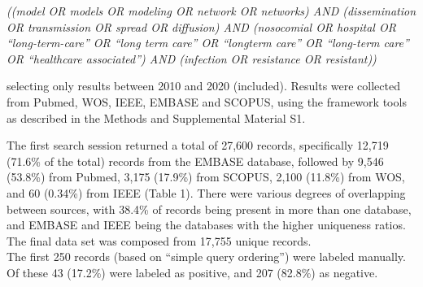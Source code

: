 \documentclass{article}
\begin{document}
\emph{((model OR models OR modeling OR network OR networks) AND
(dissemination OR transmission OR spread OR diffusion) AND (nosocomial
OR hospital OR ``long-term-care'' OR ``long term care'' OR ``longterm
care'' OR ``long-term care'' OR ``healthcare associated'') AND
(infection OR resistance OR resistant))}

selecting only results between 2010 and 2020 (included). Results were
collected from Pubmed, WOS, IEEE, EMBASE and SCOPUS, using the framework
tools as described in the Methods and Supplemental Material S1.

The first search session returned a total of 27,600 records,
specifically 12,719 (71.6\% of the total) records from the EMBASE
database, followed by 9,546 (53.8\%) from Pubmed, 3,175 (17.9\%) from
SCOPUS, 2,100 (11.8\%) from WOS, and 60 (0.34\%) from IEEE (Table 1).
There were various degrees of overlapping between sources, with 38.4\%
of records being present in more than one database, and EMBASE and IEEE
being the databases with the higher uniqueness ratios. The final data
set was composed from 17,755 unique records.\\
The first 250 records (based on ``simple query ordering'') were labeled
manually. Of these 43 (17.2\%) were labeled as positive, and 207
(82.8\%) as negative.
\end{document}

